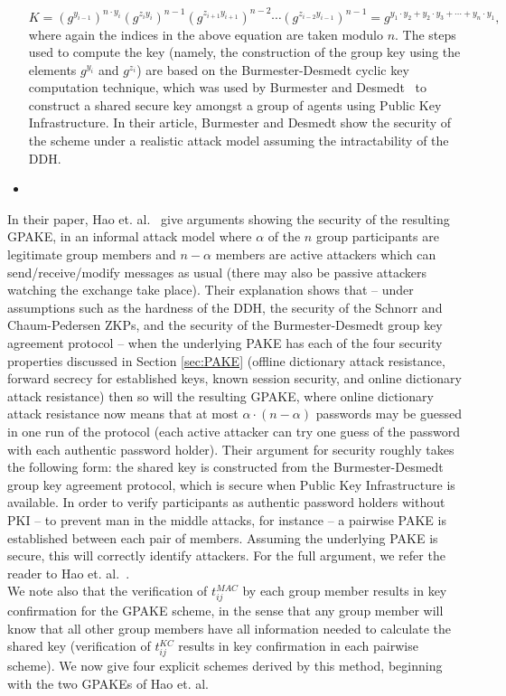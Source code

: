 \begin{itemize}
\begin{equation} K = (g^{y_{i-1}})^{n \cdot y_i} (g^{z_iy_i})^{n-1}(g^{z_{i+1}y_{i+1}})^{n-2} \cdots (g^{z_{i-2}y_{i-1}})^{n-1} =  g^{y_1 \cdot y_2 + y_2 \cdot y_3 + \cdots + y_n \cdot y_1}, \label{eq:key} \end{equation}
where again the indices in the above equation are taken modulo $n$. The steps used to compute the key (namely, the construction of the group key using the elements $g^{y_i}$ and $g^{z_i}$) are based on the Burmester-Desmedt cyclic key computation technique, which was used by Burmester and Desmedt~\cite{BuDe95} to construct a shared secure key amongst a group of agents using Public Key Infrastructure.  In their article, Burmester and Desmedt show the security of the scheme under a realistic attack model assuming the intractability of the DDH.
\item[]
\end{itemize}

In their paper, Hao et. al.~\cite{HaYiChSh15} give arguments showing the security of the resulting GPAKE, in an informal attack model where $\alpha$ of the $n$ group participants are legitimate group members and $n-\alpha$ members are active attackers which can send/receive/modify messages as usual (there may also be passive attackers watching the exchange take place).  Their  explanation shows that -- under assumptions such as the hardness of the DDH, the security of the Schnorr and Chaum-Pedersen ZKPs, and the security of the Burmester-Desmedt group key agreement protocol -- when the underlying PAKE has each of the four security properties discussed in Section \ref{sec:PAKE} (offline dictionary attack resistance, forward secrecy for established keys, known session security, and online dictionary attack resistance) then so will the resulting GPAKE, where online dictionary attack resistance now means that at most $\alpha \cdot (n - \alpha)$ passwords may be guessed in one run of the protocol (each active attacker can try one guess of the password with each authentic password holder).  Their argument for security roughly takes the following form: the shared key is constructed from the Burmester-Desmedt group key agreement protocol, which is secure when Public Key Infrastructure is available.  In order to verify participants as authentic password holders without PKI -- to prevent man in the middle attacks, for instance -- a pairwise PAKE is established between each pair of members.  Assuming the underlying PAKE is secure, this will correctly identify attackers. For the full argument, we refer the reader to Hao et. al.~\cite{HaYiChSh15}.
\\

We note also that the verification of $t_{ij}^{MAC}$ by each group member results in key confirmation for the GPAKE scheme, in the sense that any group member will know that all other group members have all information needed to calculate the shared key (verification of $t_{ij}^{KC}$ results in key confirmation in each pairwise scheme).  We now give four explicit schemes derived by this method, beginning with the two GPAKEs of Hao et. al.



